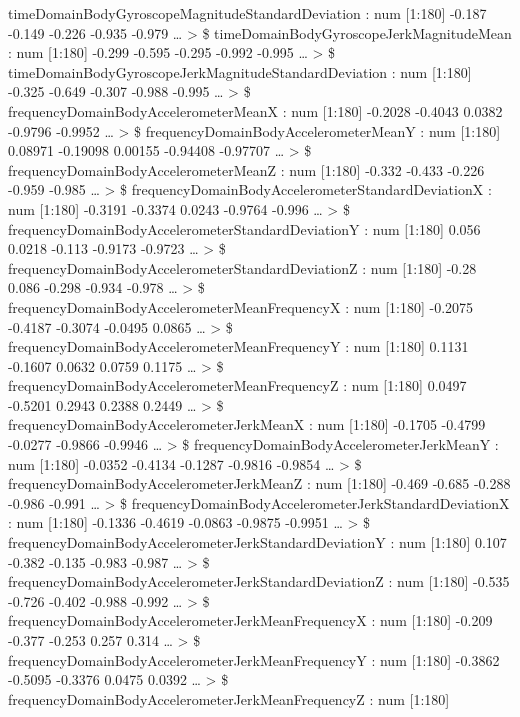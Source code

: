\documentclass[
]{article}
\begin{document}
timeDomainBodyGyroscopeMagnitudeStandardDeviation : num {[}1:180{]}
-0.187 -0.149 -0.226 -0.935 -0.979 \ldots{} \textgreater{} \$
timeDomainBodyGyroscopeJerkMagnitudeMean : num {[}1:180{]} -0.299 -0.595
-0.295 -0.992 -0.995 \ldots{} \textgreater{} \$
timeDomainBodyGyroscopeJerkMagnitudeStandardDeviation : num {[}1:180{]}
-0.325 -0.649 -0.307 -0.988 -0.995 \ldots{} \textgreater{} \$
frequencyDomainBodyAccelerometerMeanX : num {[}1:180{]} -0.2028 -0.4043
0.0382 -0.9796 -0.9952 \ldots{} \textgreater{} \$
frequencyDomainBodyAccelerometerMeanY : num {[}1:180{]} 0.08971 -0.19098
0.00155 -0.94408 -0.97707 \ldots{} \textgreater{} \$
frequencyDomainBodyAccelerometerMeanZ : num {[}1:180{]} -0.332 -0.433
-0.226 -0.959 -0.985 \ldots{} \textgreater{} \$
frequencyDomainBodyAccelerometerStandardDeviationX : num {[}1:180{]}
-0.3191 -0.3374 0.0243 -0.9764 -0.996 \ldots{} \textgreater{} \$
frequencyDomainBodyAccelerometerStandardDeviationY : num {[}1:180{]}
0.056 0.0218 -0.113 -0.9173 -0.9723 \ldots{} \textgreater{} \$
frequencyDomainBodyAccelerometerStandardDeviationZ : num {[}1:180{]}
-0.28 0.086 -0.298 -0.934 -0.978 \ldots{} \textgreater{} \$
frequencyDomainBodyAccelerometerMeanFrequencyX : num {[}1:180{]} -0.2075
-0.4187 -0.3074 -0.0495 0.0865 \ldots{} \textgreater{} \$
frequencyDomainBodyAccelerometerMeanFrequencyY : num {[}1:180{]} 0.1131
-0.1607 0.0632 0.0759 0.1175 \ldots{} \textgreater{} \$
frequencyDomainBodyAccelerometerMeanFrequencyZ : num {[}1:180{]} 0.0497
-0.5201 0.2943 0.2388 0.2449 \ldots{} \textgreater{} \$
frequencyDomainBodyAccelerometerJerkMeanX : num {[}1:180{]} -0.1705
-0.4799 -0.0277 -0.9866 -0.9946 \ldots{} \textgreater{} \$
frequencyDomainBodyAccelerometerJerkMeanY : num {[}1:180{]} -0.0352
-0.4134 -0.1287 -0.9816 -0.9854 \ldots{} \textgreater{} \$
frequencyDomainBodyAccelerometerJerkMeanZ : num {[}1:180{]} -0.469
-0.685 -0.288 -0.986 -0.991 \ldots{} \textgreater{} \$
frequencyDomainBodyAccelerometerJerkStandardDeviationX : num {[}1:180{]}
-0.1336 -0.4619 -0.0863 -0.9875 -0.9951 \ldots{} \textgreater{} \$
frequencyDomainBodyAccelerometerJerkStandardDeviationY : num {[}1:180{]}
0.107 -0.382 -0.135 -0.983 -0.987 \ldots{} \textgreater{} \$
frequencyDomainBodyAccelerometerJerkStandardDeviationZ : num {[}1:180{]}
-0.535 -0.726 -0.402 -0.988 -0.992 \ldots{} \textgreater{} \$
frequencyDomainBodyAccelerometerJerkMeanFrequencyX : num {[}1:180{]}
-0.209 -0.377 -0.253 0.257 0.314 \ldots{} \textgreater{} \$
frequencyDomainBodyAccelerometerJerkMeanFrequencyY : num {[}1:180{]}
-0.3862 -0.5095 -0.3376 0.0475 0.0392 \ldots{} \textgreater{} \$
frequencyDomainBodyAccelerometerJerkMeanFrequencyZ : num {[}1:180{]}
\end{document}
